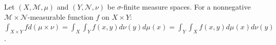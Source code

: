 Let $(X, \mathcal{M}, \mu)$ and $(Y, \mathcal{N}, \nu)$ be $\sigma$-finite measure spaces. For a nonnegative $\mathcal{M} \times \mathcal{N}$-measurable function $f$ on $X \times Y$: $\int_{X \times Y} f d(\mu \times \nu) = \int_X \int_Y f(x,y) d\nu(y) d\mu(x) = \int_Y \int_X f(x,y) d\mu(x) d\nu(y)$.
